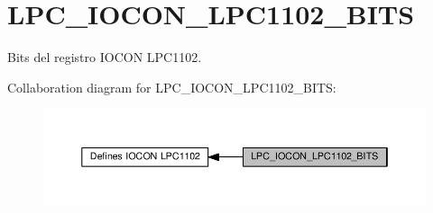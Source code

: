 \hypertarget{group___l_p_c___i_o_c_o_n___l_p_c1102___b_i_t_s}{}\section{L\+P\+C\+\_\+\+I\+O\+C\+O\+N\+\_\+\+L\+P\+C1102\+\_\+\+B\+I\+TS}
\label{group___l_p_c___i_o_c_o_n___l_p_c1102___b_i_t_s}


Bits del registro I\+O\+C\+ON L\+P\+C1102.  


Collaboration diagram for L\+P\+C\+\_\+\+I\+O\+C\+O\+N\+\_\+\+L\+P\+C1102\+\_\+\+B\+I\+TS\+:\nopagebreak
\begin{figure}[H]
\begin{center}
\leavevmode
\includegraphics[width=350pt]{group___l_p_c___i_o_c_o_n___l_p_c1102___b_i_t_s}
\end{center}
\end{figure}
